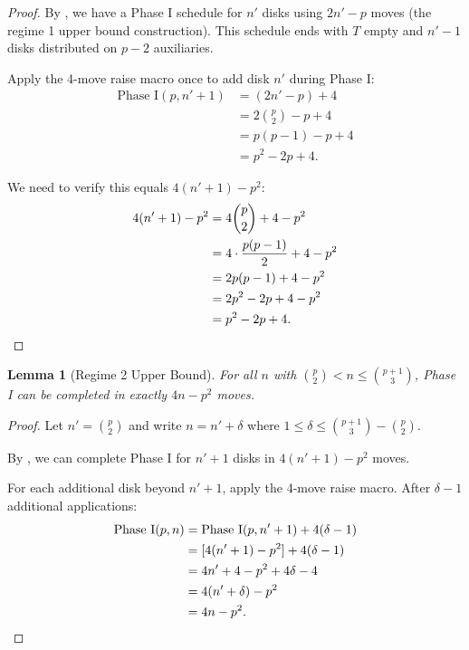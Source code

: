 \documentclass[11pt]{article}
\newtheorem{lemma}[theorem]{Lemma}
\theoremstyle{definition}
\begin{document}
\begin{proof}
By , we have a Phase I schedule for $n'$ disks using $2n' - p$ moves (the regime 1 upper bound construction). This schedule ends with $T$ empty and $n'-1$ disks distributed on $p-2$ auxiliaries.

Apply the 4-move raise macro once to add disk $n'$ during Phase I:
\begin{align*}
\text{Phase I}(p, n'+1) &= (2n' - p) + 4 \\
&= 2\binom{p}{2} - p + 4 \\
&= p(p-1) - p + 4 \\
&= p^2 - 2p + 4.
\end{align*}

We need to verify this equals $4(n'+1) - p^2$:
\begin{align*}
4(n'+1) - p^2 &= 4\binom{p}{2} + 4 - p^2 \\
&= 4 \cdot \frac{p(p-1)}{2} + 4 - p^2 \\
&= 2p(p-1) + 4 - p^2 \\
&= 2p^2 - 2p + 4 - p^2 \\
&= p^2 - 2p + 4. \qedhere
\end{align*}
\end{proof}

\begin{lemma}[Regime 2 Upper Bound]\label{lem:regime2-upper}
For all $n$ with $\binom{p}{2} < n \leq \binom{p+1}{3}$, Phase I can be completed in exactly $4n - p^2$ moves.
\end{lemma}

\begin{proof}
Let $n' = \binom{p}{2}$ and write $n = n' + \delta$ where $1 \leq \delta \leq \binom{p+1}{3} - \binom{p}{2}$.

By , we can complete Phase I for $n' + 1$ disks in $4(n'+1) - p^2$ moves.

For each additional disk beyond $n'+1$, apply the 4-move raise macro. After $\delta - 1$ additional applications:
\begin{align*}
\text{Phase I}(p, n) &= \text{Phase I}(p, n'+1) + 4(\delta - 1) \\
&= [4(n'+1) - p^2] + 4(\delta - 1) \\
&= 4n' + 4 - p^2 + 4\delta - 4 \\
&= 4(n' + \delta) - p^2 \\
&= 4n - p^2. \qedhere
\end{align*}
\end{proof}
\end{document}
